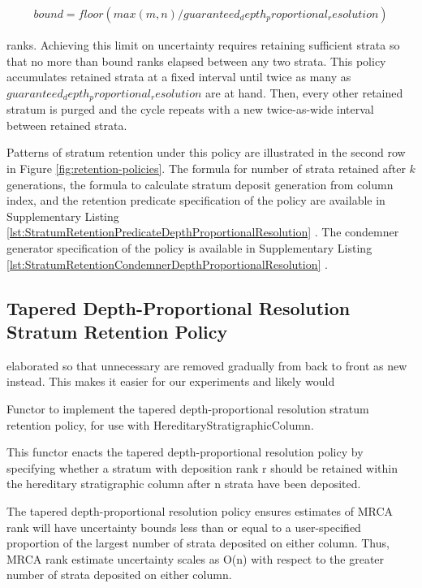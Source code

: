 \begin{align*}
    bound = floor(max(m, n) / guaranteed_depth_proportional_resolution)
\end{align*}

ranks. Achieving this limit on uncertainty requires retaining sufficient
strata so that no more than bound ranks elapsed between any two strata.
This policy accumulates retained strata at a fixed interval until twice
as many as $guaranteed_depth_proportional_resolution$ are at hand. Then,
every other retained stratum is purged and the cycle repeats with a new
twice-as-wide interval between retained strata.

Patterns of stratum retention under this policy are illustrated in the second row in Figure \ref{fig:retention-policies}.
The formula for number of strata retained after $k$ generations, the formula to calculate stratum deposit generation from column index, and the retention predicate specification of the policy are available in Supplementary Listing \ref{lst:StratumRetentionPredicateDepthProportionalResolution} \citep{moreno2022hstratconceptsupplement}.
The condemner generator specification of the policy is available in Supplementary Listing \ref{lst:StratumRetentionCondemnerDepthProportionalResolution} \citep{moreno2022hstratconceptsupplement}.

\subsection{Tapered Depth-Proportional Resolution Stratum Retention Policy}

elaborated so that unnecessary are removed gradually from back to front as new instead.
This makes it easier for our experiments and likely would

Functor to implement the tapered depth-proportional resolution stratum
retention policy, for use with HereditaryStratigraphicColumn.

This functor enacts the tapered depth-proportional resolution policy by
specifying whether a stratum with deposition rank r should be retained
within the hereditary stratigraphic column after n strata have been
deposited.

The tapered depth-proportional resolution policy ensures estimates of MRCA
rank will have uncertainty bounds less than or equal to a user-specified
proportion of the largest number of strata deposited on either column.
Thus, MRCA rank estimate uncertainty scales as O(n) with respect to the
greater number of strata deposited on either column.

